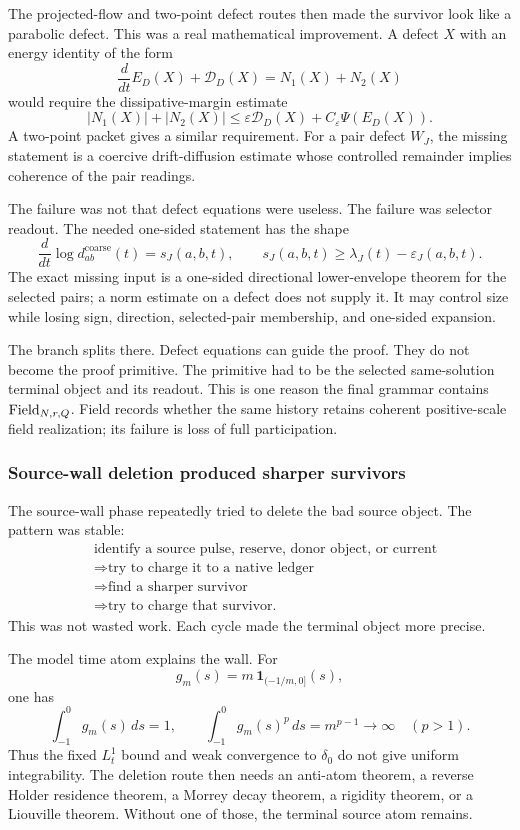 The projected-flow and two-point defect routes then made the survivor look like
a parabolic defect.
This was a real mathematical improvement.
A defect \(X\) with an energy identity of the form
\[
  \frac{d}{dt}E_D(X)+\mathcal D_D(X)
  =
  N_1(X)+N_2(X)
\]
would require the dissipative-margin estimate
\[
  |N_1(X)|+|N_2(X)|
  \le
  \varepsilon\mathcal D_D(X)+C_\varepsilon\Psi(E_D(X)).
\]
A two-point packet gives a similar requirement.
For a pair defect \(W_J\), the missing statement is a coercive drift-diffusion
estimate whose controlled remainder implies coherence of the pair readings.

The failure was not that defect equations were useless.
The failure was selector readout.
The needed one-sided statement has the shape
\[
  \frac{d}{dt}\log d_{ab}^{\mathrm{coarse}}(t)
  =
  s_J(a,b,t),
  \qquad
  s_J(a,b,t)\ge \lambda_J(t)-\varepsilon_J(a,b,t).
\]
The exact missing input is a one-sided directional lower-envelope theorem for
the selected pairs; a norm estimate on a defect does not supply it.
It may control size while losing sign, direction, selected-pair membership, and
one-sided expansion.

The branch splits there.
Defect equations can guide the proof.
They do not become the proof primitive.
The primitive had to be the selected same-solution terminal object and its
readout.
This is one reason the final grammar contains \(\mathrm{Field}_{N,r,Q}\).
Field records whether the same history retains coherent positive-scale field
realization; its failure is loss of full participation.

\subsubsection{Source-wall deletion produced sharper survivors}

The source-wall phase repeatedly tried to delete the bad source object.
The pattern was stable:
\[
  \begin{aligned}
  &\text{identify a source pulse, reserve, donor object, or current}\\
  &\Longrightarrow
  \text{try to charge it to a native ledger}\\
  &\Longrightarrow
  \text{find a sharper survivor}\\
  &\Longrightarrow
  \text{try to charge that survivor.}
  \end{aligned}
\]
This was not wasted work.
Each cycle made the terminal object more precise.

The model time atom explains the wall.
For
\[
  g_m(s)=m\,\mathbf 1_{(-1/m,0]}(s),
\]
one has
\[
  \int_{-1}^{0}g_m(s)\,ds=1,
  \qquad
  \int_{-1}^{0}g_m(s)^p\,ds=m^{p-1}\to\infty
  \quad(p>1).
\]
Thus the fixed \(L^1_t\) bound and weak convergence to \(\delta_0\) do not give
uniform integrability.
The deletion route then needs an anti-atom theorem, a reverse Holder residence
theorem, a Morrey decay theorem, a rigidity theorem, or a Liouville theorem.
Without one of those, the terminal source atom remains.

